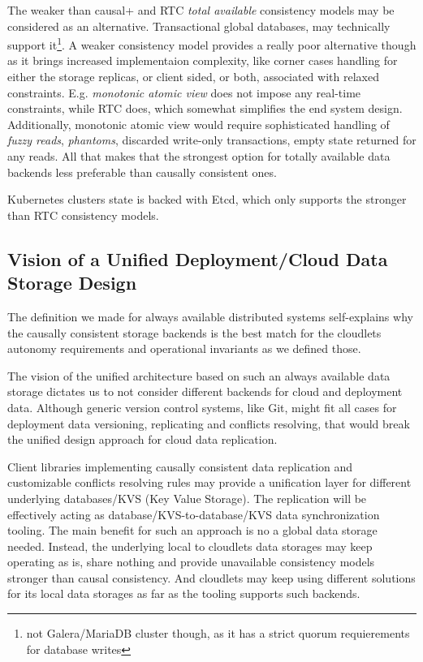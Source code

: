 \documentclass[conference]{IEEEtran}
\begin{document}
The weaker than causal+ and RTC \textit{total available}\cite{b4}
consistency models may be considered as an alternative. Transactional global
databases\cite{b5}, may technically support it\footnote{not Galera/MariaDB
cluster though, as it has a strict quorum requierements for database writes}. A
weaker consistency model provides a really poor alternative though as it brings
increased implementaion complexity, like corner cases handling for either the
storage replicas, or client sided, or both, associated with relaxed
constraints. E.g. \textit{monotonic atomic view}\cite{b4} does not impose any
real-time constraints, while RTC does, which somewhat simplifies
the end system design. Additionally, monotonic atomic view would require
sophisticated handling of \textit{fuzzy reads}\cite{b4},
\textit{phantoms}\cite{b4}, discarded write-only transactions, empty state
returned for any reads. All that makes that the strongest option for totally
available data backends less preferable than causally consistent ones.

Kubernetes clusters state is backed with Etcd, which only supports the stronger
than RTC consistency models.

\subsection{Vision of a Unified Deployment/Cloud Data Storage Design}

The definition we made for always available distributed systems self-explains
why the causally consistent storage backends is the best match for the
cloudlets autonomy requirements and operational invariants as we defined those.

The vision of the unified architecture based on such an always available data
storage dictates us to not consider different backends for cloud and deployment
data. Although generic version control systems, like Git, might fit all cases
for deployment data versioning, replicating and conflicts resolving, that would
break the unified design approach for cloud data replication.

Client libraries implementing causally consistent data replication and
customizable conflicts resolving rules may provide a unification layer for
different underlying databases/KVS (Key Value Storage). The replication will be
effectively acting as database/KVS-to-database/KVS data synchronization
tooling. The main benefit for such an approach is no a global data storage
needed. Instead, the underlying local to cloudlets data storages may keep
operating as is, share nothing and provide unavailable consistency models
stronger than causal consistency. And cloudlets may keep using different
solutions for its local data storages as far as the tooling supports such
backends.
\end{document}
